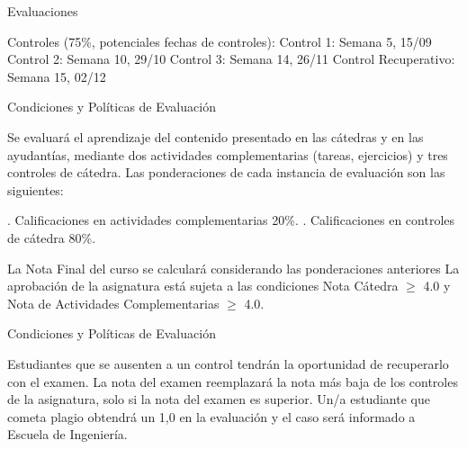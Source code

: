 \documentclass{beamer}
\begin{document}
  \begin{frame}{Evaluaciones}
  \begin{outline}
  	
  	\1 Controles (75\%, potenciales fechas de controles):
	\2  Control 1: Semana 5, 15/09
        \2  Control 2: Semana 10, 29/10
        \2  Control 3: Semana 14, 26/11
        \2  Control Recuperativo: Semana 15, 02/12


	
  \end{outline}
  \end{frame}
  
  \begin{frame}{Condiciones y Políticas de Evaluación}
  \small
  \begin{outline}
   \1 Se evaluará el aprendizaje del contenido presentado en las cátedras y en las ayudantías, mediante dos actividades complementarias (tareas, ejercicios) y tres controles de cátedra. Las ponderaciones de cada instancia de evaluación son las siguientes:
   \begin{itemize}
   . Calificaciones en actividades complementarias 20\%.
  . Calificaciones en controles de cátedra 80\%.
  \end{itemize}
   \1 La Nota Final del curso se calculará considerando las ponderaciones anteriores
    \1 La aprobación de la asignatura está sujeta a las condiciones Nota Cátedra $ \ge $ 4.0 y Nota de Actividades Complementarias $ \ge $ 4.0.
  \end{outline}
  \end{frame}
  
  \begin{frame}{Condiciones y Políticas de Evaluación}
  \small
  \begin{outline}      
   \1 Estudiantes que se ausenten a un control tendrán la oportunidad de recuperarlo con el examen. La nota del examen reemplazará la nota más baja de los controles de la asignatura, solo si la nota del examen es superior.
     \1 Un/a estudiante que cometa plagio obtendrá un 1,0 en la evaluación y el caso será informado a Escuela de Ingeniería.
  \end{outline}
  \end{frame}
\end{document}

